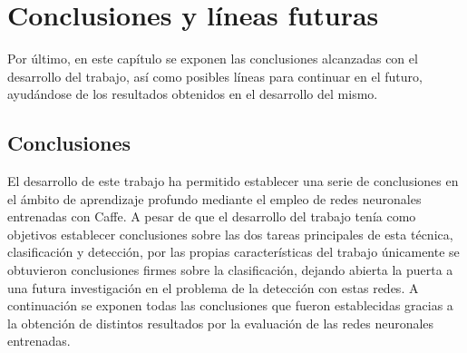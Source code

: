 \chapter{Conclusiones y líneas futuras}\label{cap.conclusiones}
Por último, en este capítulo se exponen las conclusiones alcanzadas con el desarrollo del trabajo, así como posibles líneas para continuar en el futuro, ayudándose de los resultados obtenidos en el desarrollo del mismo.

\section{Conclusiones}
El desarrollo de este trabajo ha permitido establecer una serie de conclusiones en el ámbito de aprendizaje profundo mediante el empleo de redes neuronales entrenadas con Caffe. A pesar de que el desarrollo del trabajo tenía como objetivos establecer conclusiones sobre las dos tareas principales de esta técnica, clasificación y detección, por las propias características del trabajo únicamente se obtuvieron conclusiones firmes sobre la clasificación, dejando abierta la puerta a una futura investigación en el problema de la detección con estas redes. A continuación se exponen todas las conclusiones que fueron establecidas gracias a la obtención de distintos resultados por la evaluación de las redes neuronales entrenadas.


